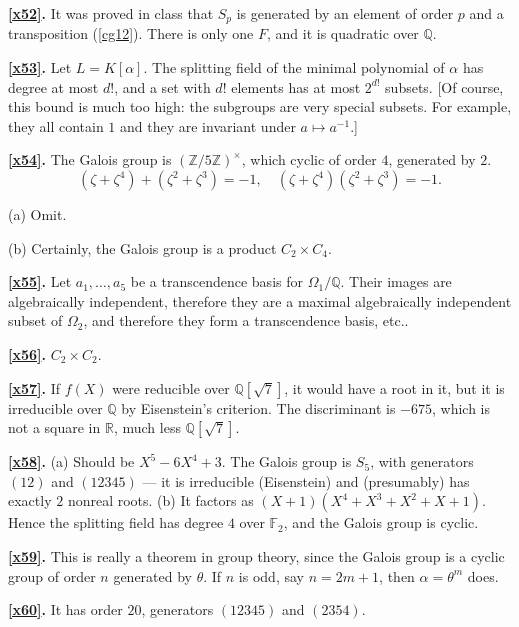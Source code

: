 \documentclass[a4paper,11pt,final,openany]{memoir}
\theoremstyle{nonumberplain}
\begin{document}
\medskip\noindent\textbf{\ref{x52}.} It was proved in class that $S_{p}$ is
generated by an element of order $p$ and a transposition (\ref{cg12}). There
is only one $F$, and it is quadratic over ${\mathbb{Q}}$.

\medskip\noindent\textbf{\ref{x53}.} Let $L=K[\alpha]$. The splitting field of
the minimal polynomial of $\alpha$ has degree at most $d!$, and a set with
$d!$ elements has at most $2^{d!}$ subsets. [Of course, this bound is much too
high: the subgroups are very special subsets. For example, they all contain
$1$ and they are invariant under $a\mapsto a^{-1}$.]

\medskip\noindent\textbf{\ref{x54}.} The Galois group is $(\mathbb{Z}%
/5\mathbb{Z})^{\times}$, which cyclic of order $4$, generated by $2$.
\[
(\zeta+\zeta^{4})+(\zeta^{2}+\zeta^{3})=-1,\quad(\zeta+\zeta^{4})(\zeta
^{2}+\zeta^{3})=-1.
\]


(a) Omit.

(b) Certainly, the Galois group is a product $C_{2}\times C_{4}$.

\medskip\noindent\textbf{\ref{x55}.} Let $a_{1},\ldots,a_{5}$ be a
transcendence basis for $\Omega_{1}/{\mathbb{Q}}$. Their images are
algebraically independent, therefore they are a maximal algebraically
independent subset of $\Omega_{2}$, and therefore they form a transcendence
basis, etc..

\medskip\noindent\textbf{\ref{x56}.} $C_{2}\times C_{2}$.

\medskip\noindent\textbf{\ref{x57}.} If $f(X)$ were reducible over
${\mathbb{Q}}[\sqrt{7}]$, it would have a root in it, but it is irreducible
over ${\mathbb{Q}}$ by Eisenstein's criterion. The discriminant is $-675$,
which is not a square in $\mathbb{R}$, much less ${\mathbb{Q}}[\sqrt{7}]$.

\medskip\noindent\textbf{\ref{x58}.} (a) Should be $X^{5}-6X^{4}+3$. The
Galois group is $S_{5}$, with generators $(12)$ and $(12345)$ --- it is
irreducible (Eisenstein) and (presumably) has exactly $2$ nonreal roots. (b)
It factors as $(X+1)(X^{4}+X^{3}+X^{2}+X+1)$. Hence the splitting field has
degree $4$ over $\mathbb{F}_{2}$, and the Galois group is cyclic.

\medskip\noindent\textbf{\ref{x59}.} This is really a theorem in group theory,
since the Galois group is a cyclic group of order $n$ generated by $\theta$.
If $n$ is odd, say $n=2m+1$, then $\alpha=\theta^{m}$ does.

\medskip\noindent\textbf{\ref{x60}.} It has order $20$, generators $(12345)$
and $(2354)$.
\end{document}
